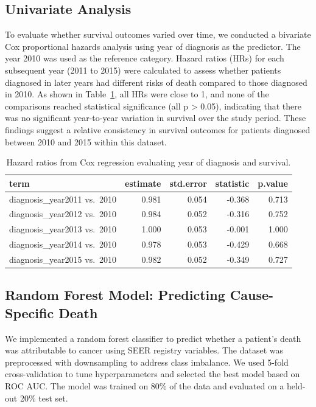 \documentclass[
  letterpaper,
  DIV=11,
  numbers=noendperiod]{scrartcl}
\begin{document}
\subsection{Univariate Analysis}\label{univariate-analysis}

To evaluate whether survival outcomes varied over time, we conducted a
bivariate Cox proportional hazards analysis using year of diagnosis as
the predictor. The year 2010 was used as the reference category. Hazard
ratios (HRs) for each subsequent year (2011 to 2015) were calculated to
assess whether patients diagnosed in later years had different risks of
death compared to those diagnosed in 2010. As shown in
Table~\ref{tbl-year-diagnosis}, all HRs were close to 1, and none of the
comparisons reached statistical significance (all p \textgreater{}
0.05), indicating that there was no significant year-to-year variation
in survival over the study period. These findings suggest a relative
consistency in survival outcomes for patients diagnosed between 2010 and
2015 within this dataset.

\begin{longtable}[]{@{}lrrrr@{}}

\caption{\label{tbl-year-diagnosis}Hazard ratios from Cox regression
evaluating year of diagnosis and survival.}

\tabularnewline

\toprule\noalign{}
term & estimate & std.error & statistic & p.value \\
\midrule\noalign{}
\endhead
\bottomrule\noalign{}
\endlastfoot
diagnosis\_year2011 vs.~2010 & 0.981 & 0.054 & -0.368 & 0.713 \\
diagnosis\_year2012 vs.~2010 & 0.984 & 0.052 & -0.316 & 0.752 \\
diagnosis\_year2013 vs.~2010 & 1.000 & 0.053 & -0.001 & 1.000 \\
diagnosis\_year2014 vs.~2010 & 0.978 & 0.053 & -0.429 & 0.668 \\
diagnosis\_year2015 vs.~2010 & 0.982 & 0.052 & -0.349 & 0.727 \\

\end{longtable}

\subsection{Random Forest Model: Predicting Cause-Specific
Death}\label{random-forest-model-predicting-cause-specific-death}

We implemented a random forest classifier to predict whether a patient's
death was attributable to cancer using SEER registry variables. The
dataset was preprocessed with downsampling to address class imbalance.
We used 5-fold cross-validation to tune hyperparameters and selected the
best model based on ROC AUC. The model was trained on 80\% of the data
and evaluated on a held-out 20\% test set.
\end{document}
